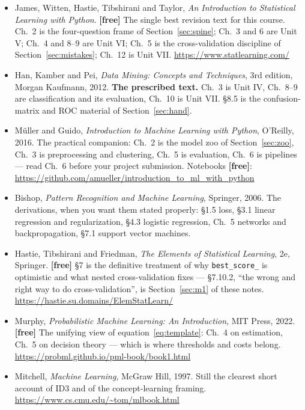 \documentclass[11pt]{article}
\begin{document}
\begin{itemize}[leftmargin=*]
  \item James, Witten, Hastie, Tibshirani and Taylor, \emph{An Introduction to
    Statistical Learning with Python}. \textbf{[free]} The single best
    revision text for this course. Ch.~2 is the four-question frame of
    Section~\ref{sec:spine}; Ch.~3 and 6 are Unit V; Ch.~4 and 8--9 are
    Unit VI; Ch.~5 is the cross-validation discipline of
    Section~\ref{sec:mistakes}; Ch.~12 is Unit VII.
    \url{https://www.statlearning.com/}
  \item Han, Kamber and Pei, \emph{Data Mining: Concepts and Techniques}, 3rd
    edition, Morgan Kaufmann, 2012. \textbf{The prescribed text.} Ch.~3 is
    Unit IV, Ch.~8--9 are classification and its evaluation, Ch.~10 is
    Unit VII. \S8.5 is the confusion-matrix and ROC material of
    Section~\ref{sec:hand}.
  \item M\"uller and Guido, \emph{Introduction to Machine Learning with
    Python}, O'Reilly, 2016. The practical companion: Ch.~2 is the model zoo
    of Section~\ref{sec:zoo}, Ch.~3 is preprocessing and clustering, Ch.~5 is
    evaluation, Ch.~6 is pipelines --- read Ch.~6 before your project
    submission. Notebooks \textbf{[free]}:
    \url{https://github.com/amueller/introduction_to_ml_with_python}
  \item Bishop, \emph{Pattern Recognition and Machine Learning}, Springer,
    2006. The derivations, when you want them stated properly: \S1.5 loss,
    \S3.1 linear regression and regularization, \S4.3 logistic regression,
    Ch.~5 networks and backpropagation, \S7.1 support vector machines.
  \item Hastie, Tibshirani and Friedman, \emph{The Elements of Statistical
    Learning}, 2e, Springer. \textbf{[free]} \S7 is the definitive treatment
    of why \texttt{best\_score\_} is optimistic and what nested
    cross-validation fixes --- \S7.10.2, ``the wrong and right way to do
    cross-validation'', is Section~\ref{sec:m1} of these notes.
    \url{https://hastie.su.domains/ElemStatLearn/}
  \item Murphy, \emph{Probabilistic Machine Learning: An Introduction}, MIT
    Press, 2022. \textbf{[free]} The unifying view of
    equation~\eqref{eq:template}: Ch.~4 on estimation, Ch.~5 on decision
    theory --- which is where thresholds and costs belong.
    \url{https://probml.github.io/pml-book/book1.html}
  \item Mitchell, \emph{Machine Learning}, McGraw Hill, 1997. Still the
    clearest short account of ID3 and of the concept-learning framing.
    \url{https://www.cs.cmu.edu/~tom/mlbook.html}
\end{itemize}
\end{document}
